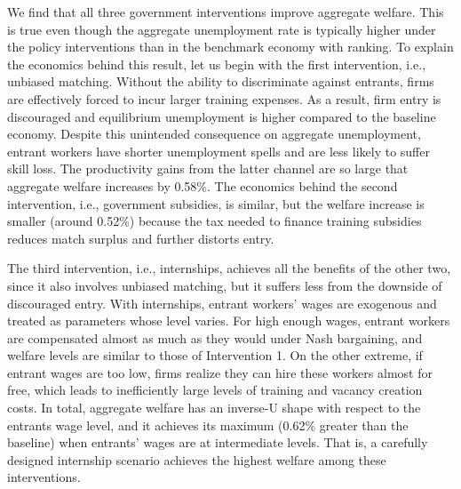 \documentclass[12pt]{article} %
\theoremstyle{definition}
\begin{document}
We find that all three government interventions improve aggregate welfare. 
This is true even though the aggregate unemployment rate is typically higher under the policy interventions than in the benchmark economy with ranking.
To explain the economics behind this result, let us begin with the first intervention, i.e., unbiased matching.
Without the ability to discriminate against entrants, firms are effectively forced to incur larger training expenses.
As a result, firm entry is discouraged and equilibrium unemployment is higher compared to the baseline economy.
Despite this unintended consequence on aggregate unemployment, entrant workers have shorter unemployment spells and are less likely to suffer skill loss.
The productivity gains from the latter channel are so large that aggregate welfare increases by 0.58\%. %
The economics behind the second intervention, i.e., government subsidies, is similar, but the welfare increase is smaller (around 0.52\%) because the tax needed to finance training subsidies reduces match surplus and further distorts entry.

The third intervention, i.e., internships, achieves all the benefits of the other two, since it also involves unbiased matching, but it suffers less from the downside of discouraged entry. With internships, entrant workers' wages are exogenous and treated as parameters whose level varies.
For high enough wages, entrant workers are compensated almost as much as they would under Nash bargaining, and welfare levels are similar to those of Intervention 1.
On the other extreme, if entrant wages are too low, firms realize they can hire these workers almost for free, which leads to inefficiently large levels of training and vacancy creation costs. 
In total, aggregate welfare has an inverse-U shape with respect to the entrants wage level, and it achieves its maximum (0.62\% greater than the baseline) when entrants' wages are at intermediate levels. 
That is, a carefully designed internship scenario achieves the highest welfare among these interventions.

\end{document}
